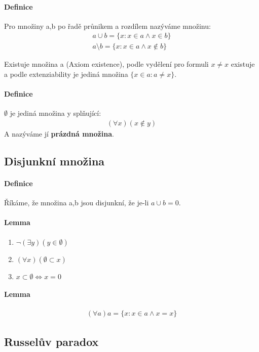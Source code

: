 \documentclass[a4paper,12pt,titlepage]{article}
\begin{document}
\paragraph{Definice}
Pro množiny a,b po řadě průnikem a rozdílem nazýváme množinu:
\begin{align}
	a \cup b = \{ x : x \in a \land x \in b \} \\
	a \setminus b = \{ x : x \in a \land x \nin b \}
\end{align}

Existuje množina a (Axiom existence), podle vydělení pro formuli $x \neq x$
existuje a podle extenziability je jediná množina $\{ x \in a : a \neq x \}$.


\paragraph{Definice}
$\emptyset$ je jediná množina y splňující:
\begin{align}
	(\forall x) (x \nin y)
\end{align}
A nazýváme jí \textbf{prázdná množina}.

\subsection{Disjunkní množina}
\setcounter{equation}{0}
\paragraph{Definice}
Říkáme, že množina a,b jsou disjunkní, že  je-li $a \cup b = 0$.

\paragraph{Lemma}
\begin{enumerate}
	\item $\neg (\exists y)(y \in \emptyset)$
	\item $(\forall x) (\emptyset \subset x)$
	\item $x \subset \emptyset \Leftrightarrow x = 0$
\end{enumerate}
\paragraph{Lemma}
\begin{align}
	(\forall a) a = \{ x : x \in a \land x = x \}
\end{align}


\subsection{Russelův paradox}
\setcounter{equation}{0}
\end{document}
